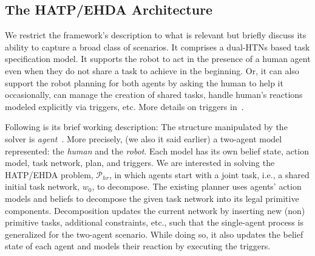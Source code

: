 \documentclass[letterpaper]{article} %
\begin{document}
\subsection{The HATP/EHDA Architecture}
% 
% 
We restrict the framework's description to what is relevant but briefly discuss its ability to capture a broad class of scenarios. 
It comprises a dual-HTNs based task specification model. It supports the robot to act in the presence of a human agent even when they do not share a task to achieve in the beginning. Or, it can also support the robot planning for both agents by asking the human to help it occasionally, can manage the creation of shared tasks, handle human's reactions modeled explicitly via triggers, etc. More details on triggers  in~\cite{ingrand1996prs,AlamiCFGI98}.   

Following is its brief working description: The structure manipulated by the solver is \textit{agent}~\cite{thesisBuisan21}. 
More precisely, (we also it said earlier) a two-agent model represented: the \textit{human} and the \textit{robot}. 
Each model has its own belief state, action model, task network, plan, and triggers. We are interested in solving the HATP/EHDA problem, $\mathcal{P}_{hr}$, in which agents start with a joint task, i.e., a shared initial task network, $w_0$, to decompose.
The existing planner uses agents' action models and beliefs to decompose the given task network into its legal primitive components. 
Decomposition updates the current network by inserting new (non) primitive tasks, additional constraints, etc., such that the single-agent process is generalized for the two-agent scenario.
While doing so, it also updates the belief state of each agent and models their reaction by executing the triggers.
\end{document}
